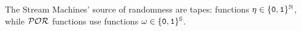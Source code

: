 \documentclass[xcolor={x11names}]{beamer}
\begin{document}
\begin{frame}
\begin{overprint}

	The Stream Machines' source of randomness are tapes: functions $\eta \in \{\mathtt{0}, \mathtt{1}\}^{\mathbb{N}}$, while $\mathcal{POR}$ functions use functions $\omega \in \{\mathtt{0}, \mathtt{1}\}^{\mathbb{S}}$.\\


\end{overprint}
\end{frame}
\end{document}
